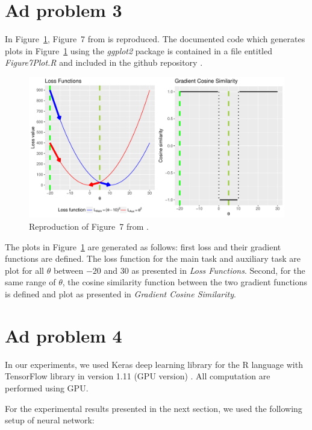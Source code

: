 \documentclass{article} %
\begin{document}
\section{Ad problem 3}

In Figure~\ref{Fig:LossFunc}, Figure~7 from \citep{du2018adapting} is reproduced. The documented code which generates plots in Figure~\ref{Fig:LossFunc} using the \textit{ggplot2} package is contained in a file entitled \textit{Figure7Plot.R} and included in the github repository \citep{Github}.  

\begin{figure}[h!t]
	\centering 
	\includegraphics[width=1.0\linewidth]{Figure7.pdf}
	\caption{Reproduction of Figure~7 from \citep{du2018adapting}.}
	\label{Fig:LossFunc} 
\end{figure}

The plots in Figure~\ref{Fig:LossFunc} are generated as follows: first loss and their gradient functions are defined. The loss function for the main task and auxiliary task are plot for all $ \theta $ between $ -20 $ and $ 30 $ as presented in \textit{Loss Functions}. Second,  for the same range of $ \theta $, the cosine similarity function between the two gradient functions is defined and plot as presented in \textit{Gradient Cosine Similarity}.  

\section{Ad problem 4}

In our experiments, we used Keras deep learning library for the R language \cite{Keras}  with TensorFlow library in version 1.11 (GPU version) \cite{TensorFlow}. All computation are performed using GPU. 

For the experimental results presented in the next section, we used the following setup of neural network:
\end{document}
